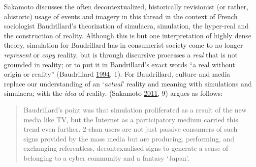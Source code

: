 \documentclass[10pt,british,A4paper,,openany]{memoir}
\begin{document}
Sakamoto discusses the often decontextualized, historically revisionist
(or rather, ahistoric) usage of events and imagery in this thread in the
context of French sociologist Baudrillard's theorization of simulacra,
simulation, the hyper-real and the construction of reality. Although
this is but one interpretation of highly dense theory, simulation for
Baudrillard has in consumerist society come to no longer
\emph{represent} or \emph{copy} reality, but is through discursive
processes a \emph{real} that is not grounded in reality; or to put it in
Baudrillard's exact words ``a real without origin or reality''
(Baudrillard \protect\hyperlink{ref-baudrillard_simulacra_1994}{1994},
1). For Baudrillard, culture and media replace our understanding of an
`\emph{actual}' reality and meaning with simulations and simulacra; with
the \emph{idea} of reality. (Sakamoto
\protect\hyperlink{ref-sakamoto_koreans_2011}{2011}, 9) argues as
follows:

\begin{quote}
Baudrillard's point was that simulation proliferated as a result of the
new media like TV, but the Internet as a participatory medium carried
this trend even further. 2-chan users are not just passive consumers of
such signs provided by the mass media but are producing, performing, and
exchanging referentless, decontexualised signs to generate a sense of
belonging to a cyber community and a fantasy `Japan'.
\end{quote}
\end{document}
